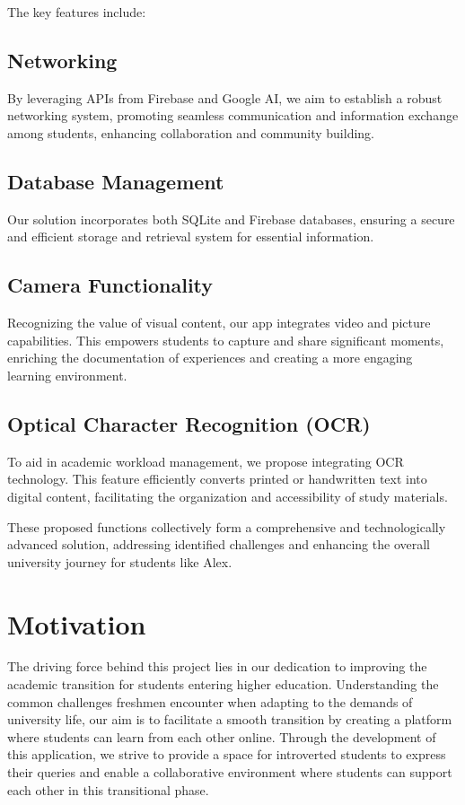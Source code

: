 The key features include:

\subsection{Networking}

By leveraging APIs from Firebase and Google AI, we aim to establish a robust networking system, promoting seamless communication and information exchange among students, enhancing collaboration and community building.

\subsection{Database Management}

Our solution incorporates both SQLite and Firebase databases, ensuring a secure and efficient storage and retrieval system for essential information.

\subsection{Camera Functionality}

Recognizing the value of visual content, our app integrates video and picture capabilities. This empowers students to capture and share significant moments, enriching the documentation of experiences and creating a more engaging learning environment.

\subsection{Optical Character Recognition (OCR)}

To aid in academic workload management, we propose integrating OCR technology. This feature efficiently converts printed or handwritten text into digital content, facilitating the organization and accessibility of study materials.

These proposed functions collectively form a comprehensive and technologically advanced solution, addressing identified challenges and enhancing the overall university journey for students like Alex.

\section{Motivation}

The driving force behind this project lies in our dedication to improving the academic transition for students entering higher education. Understanding the common challenges freshmen encounter when adapting to the demands of university life, our aim is to facilitate a smooth transition by creating a platform where students can learn from each other online. Through the development of this application, we strive to provide a space for introverted students to express their queries and enable a collaborative environment where students can support each other in this transitional phase.

